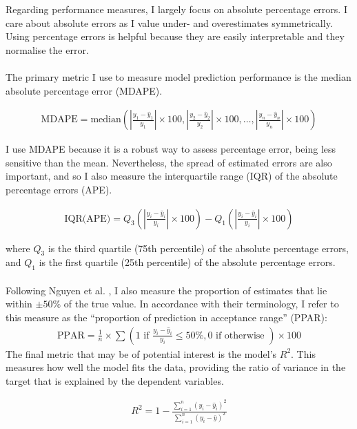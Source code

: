 \documentclass[12pt,twoside]{report}
\begin{document}
Regarding performance measures, I largely focus on absolute percentage errors. I care about absolute errors as I value under- and overestimates symmetrically. Using percentage errors is helpful because they are easily interpretable and they normalise the error. 
\\\\
The primary metric I use to measure model prediction performance is the median absolute percentage error (MDAPE).

\begin{align}
    \text{MDAPE} = \text{median} \left( \left| \frac{y_1 - \hat{y}_1}{y_1} \right| \times 100, \left| \frac{y_2 - \hat{y}_2}{y_2} \right| \times 100, \dots, \left| \frac{y_n - \hat{y}_n}{y_n} \right| \times 100 \right)
\end{align}

I use MDAPE because it is a robust way to assess percentage error, being less sensitive than the mean. Nevertheless, the spread of estimated errors are also important, and so I also measure the interquartile range (IQR) of the absolute percentage errors (APE). 

\begin{align}
    \text{IQR(APE)} = Q_3 \left( \left| \frac{y_i - \hat{y}_i}{y_i} \right| \times 100 \right) - Q_1 \left( \left| \frac{y_i - \hat{y}_i}{y_i} \right| \times 100 \right)
\end{align}

where $Q_{3}$ is the third quartile (75th percentile) of the absolute percentage errors, and $Q_{1}$ is the first quartile (25th percentile) of the absolute percentage errors. 
\\\\
Following Nguyen et al. \cite{Nguyenetal2023}, I also measure the proportion of estimates that lie within $\pm50\%$
of the true value. In accordance with their terminology, I refer to this measure as the ``proportion of prediction in acceptance range'' (PPAR):
\begin{align}
    \text{PPAR} = \frac{1}{n} \times \sum \left( 1 \text{ if } \frac{y_i - \hat{y}_i}{y_i} \leq 50\%, 0 \text{ if otherwise } \right) \times 100
\end{align}
The final metric that may be of potential interest is the model's $R^{2}$. This measures how well the model fits the data, providing the ratio of variance in the target that is explained by the dependent variables. 

\begin{align}
    R^2 = 1 - \frac{\sum_{i=1}^{n} (y_i - \hat{y}_i)^2}{\sum_{i=1}^{n} (y_i - \bar{y})^2}
\end{align}
\end{document}
